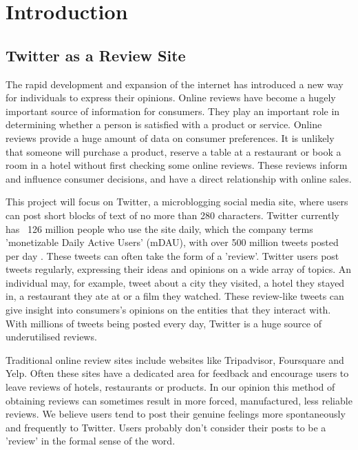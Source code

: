 
\chapter{Introduction}

\section{Twitter as a Review Site}
The rapid development and expansion of the internet has introduced a new way for individuals to express their opinions. Online reviews have become a hugely important source of information for consumers. They play an important role in determining whether a person is satisfied with a product or service. Online reviews provide a huge amount of data on consumer preferences. It is unlikely that someone will purchase a product, reserve a table at a restaurant or book a room in a hotel without first checking some online reviews. These reviews inform and influence consumer decisions, and have a direct relationship with online sales. 

This project will focus on Twitter, a microblogging social media site, where users can post short blocks of text of no more than 280 characters. Twitter currently has ~126 million people who use the site daily, which the company terms 'monetizable Daily Active Users' (mDAU),
with over 500 million tweets posted per day \cite{Twitter2019}. These tweets can often take the form of a 'review'.
Twitter users post tweets regularly, expressing their ideas and opinions on a wide array of topics. An individual may, for example, tweet about a city they visited, a hotel they stayed in, a restaurant they ate at or a film they watched. These review-like tweets can give insight into consumers’s opinions on the entities that they interact with. With millions of tweets being posted every day, Twitter is a huge source of underutilised reviews.

Traditional online review sites include websites like Tripadvisor, Foursquare and Yelp. Often these sites have a dedicated area for feedback and encourage users to leave reviews of hotels, restaurants or products. In our opinion this method of obtaining reviews can sometimes result in more forced, manufactured, less reliable reviews. We believe users tend to post their genuine feelings more spontaneously and frequently to Twitter. Users probably don't consider their posts to be a 'review' in the formal sense of the word.

